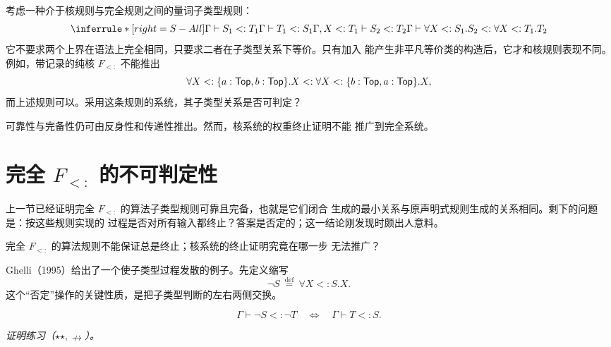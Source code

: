 \begin{exercise}[\(\star\star\star\star\), \(\nrightarrow\)]
\label{ex:28.4.3}
考虑一种介于核规则与完全规则之间的量词子类型规则：
\[
\inferrule*[right=S-All]
 {\Gamma\vdash S_1<:T_1\\
  \Gamma\vdash T_1<:S_1\\
  \Gamma,X<:T_1\vdash S_2<:T_2}
 {\Gamma\vdash
  \forall X<:S_1.S_2<:\forall X<:T_1.T_2}
\]
它不要求两个上界在语法上完全相同，只要求二者在子类型关系下等价。只有加入
能产生非平凡等价类的构造后，它才和核规则表现不同。例如，带记录的纯核
\(F_{<:}\) 不能推出
\[
\forall X<:\{a:\mathsf{Top},b:\mathsf{Top}\}.X
<:
\forall X<:\{b:\mathsf{Top},a:\mathsf{Top}\}.X,
\]
而上述规则可以。采用这条规则的系统，其子类型关系是否可判定？
\end{exercise}

可靠性与完备性仍可由反身性和传递性推出。然而，核系统的权重终止证明不能
推广到完全系统。

\section{完全 \(F_{<:}\) 的不可判定性}
\label{sec:28.5}

上一节已经证明完全 \(F_{<:}\) 的算法子类型规则可靠且完备，也就是它们闭合
生成的最小关系与原声明式规则生成的关系相同。剩下的问题是：按这些规则实现的
过程是否对所有输入都终止？答案是否定的；这一结论刚发现时颇出人意料。

\begin{exercise}[\(\star\)]
\label{ex:28.5.1}
完全 \(F_{<:}\) 的算法规则不能保证总是终止；核系统的终止证明究竟在哪一步
无法推广？
\end{exercise}

Ghelli（1995）给出了一个使子类型过程发散的例子。先定义缩写
\[
\neg S\ \overset{\mathrm{def}}{=}\ \forall X<:S.X.
\]
这个“否定”操作的关键性质，是把子类型判断的左右两侧交换。

\begin{fact}
\label{fact:28.5.2}
\[
\Gamma\vdash\neg S<:\neg T
\quad\Longleftrightarrow\quad
\Gamma\vdash T<:S.
\]
\end{fact}
\noindent\textit{证明练习（\(\star\star,\nrightarrow\)）。}

